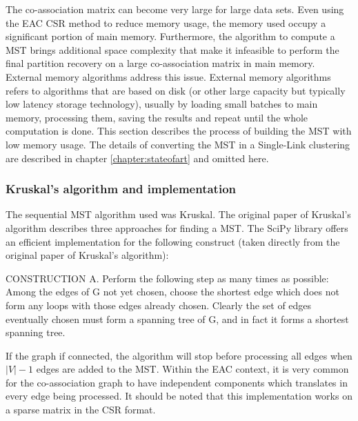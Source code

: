 The co-association matrix can become very large for large data sets.
Even using the EAC CSR method to reduce memory usage, the memory used occupy a significant portion of main memory.
Furthermore, the algorithm to compute a MST brings additional space complexity that make it infeasible to perform the final partition recovery on a large co-association matrix in main memory.
External memory algorithms address this issue.
External memory algorithms refers to algorithms that are based on disk (or other large capacity but typically low latency storage technology), usually by loading small batches to main memory, processing them, saving the results and repeat until the whole computation is done.
This section describes the process of building the MST with low memory usage.
The details of converting the MST in a Single-Link clustering are described in chapter \ref{chapter:stateofart} and omitted here.

\subsubsection{Kruskal's algorithm and implementation}

The sequential MST algorithm used was Kruskal.
The original paper of Kruskal's \cite{kruskal1956shortest} algorithm describes three approaches for finding a MST.
The SciPy library offers an efficient implementation for the following construct (taken directly from the original paper of Kruskal's algorithm):
\begin{displayquote}
CONSTRUCTION A. Perform the following step as many times as possible: Among the edges of G not yet chosen, choose the shortest edge which does not form any loops with those edges already chosen. Clearly the set of edges eventually chosen must form a spanning tree of G, and in fact it forms a shortest spanning tree.
\end{displayquote}
If the graph if connected, the algorithm will stop before processing all edges when $|V| - 1$ edges are added to the MST.
Within the EAC context, it is very common for the co-association graph to have independent components which translates in every edge being processed.
It should be noted that this implementation works on a sparse matrix in the CSR format.

